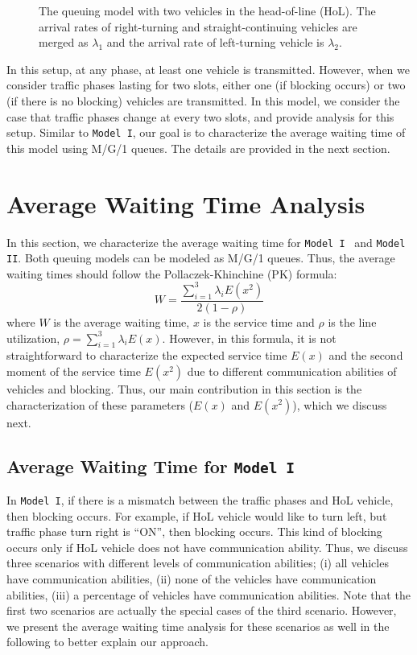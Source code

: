 \documentclass[conference]{IEEEtran}
\newcommand{\modelI}{{\tt{Model I}}}
\newcommand{\modelII}{{\tt{Model II}}}
\begin{document}
\begin{figure} [t!]
\vspace{-10pt}
\centering
{}
\caption{\label{model2} The queuing model with two vehicles in the head-of-line (HoL). The arrival rates of right-turning and straight-continuing vehicles are merged as $\lambda_1$ and the arrival rate of left-turning vehicle is $\lambda_2$.}
\vspace{-15pt}
\end{figure}

In this setup, at any phase, at least one vehicle is transmitted. However, when we consider traffic phases lasting for two slots, either one (if blocking occurs) or two (if there is no blocking) vehicles are transmitted. In this model, we consider the case that traffic phases change at every two slots, and provide analysis for this setup. Similar to \modelI, our goal is to characterize the average waiting time of this model using M/G/1 queues. The details are provided in the next section.

\vspace{-5pt}
\section{Average Waiting Time Analysis}\label{sec:waiting_time}
In this section, we characterize the average waiting time for \modelI~ and \modelII. Both queuing models can be modeled as M/G/1 queues. Thus, the average waiting times should follow the Pollaczek-Khinchine (PK) formula:
\begin{equation} \label{eq:PK}
W=\frac{\sum\limits_{i=1}^{3}\lambda_iE(x^2)}{2(1-\rho)}
\end{equation} where $W$ is the average waiting time, $x$ is the service time and $\rho$ is the line utilization, $\rho=\sum\limits_{i=1}^{3}\lambda_iE(x)$. However, in this formula, it is not straightforward to characterize the expected service time $E(x)$ and the second moment of the service time $E(x^2)$ due to different communication abilities of vehicles and blocking. Thus, our main contribution in this section is the characterization of these parameters ($E(x)$ and $E(x^2)$), which we discuss next.

\vspace{-5pt}
\subsection{Average Waiting Time for \modelI}
In \modelI, if there is a mismatch between the traffic phases and HoL vehicle, then blocking occurs. For example, if HoL vehicle would like to turn left, but traffic phase turn right is ``ON'', then blocking occurs. This kind of blocking occurs only if HoL vehicle does not have communication ability. Thus, we discuss three scenarios with different levels of communication abilities; (i) all vehicles have communication abilities, (ii) none of the vehicles have communication abilities, (iii) a percentage of vehicles have communication abilities. Note that the first two scenarios are actually the special cases of the third scenario. However, we present the average waiting time analysis for these scenarios as well in the following to better explain our approach.
\end{document}
